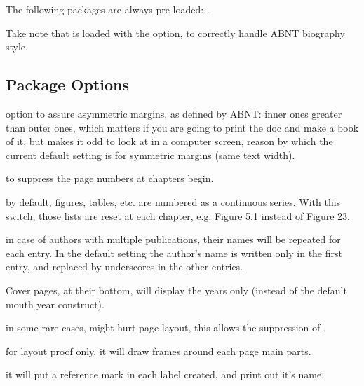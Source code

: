 \documentclass[article,nogeometry,english,tocdepth=3,secdepth=3]{ufrgscca} %
\begin{document}
The following packages are always pre-loaded: .

Take note that  is loaded with the \textbf{} option, to correctly handle ABNT biography style.

\subsection{Package Options}


\begin{describelist}{option}
	 {to assure asymmetric margins, as defined by ABNT: inner ones greater than outer ones, which matters if you are going to print the doc and make a book of it, but makes it odd to look at in a computer screen, reason by which the current default setting is for symmetric margins (same text width).}

 	 { to suppress the page numbers at chapters begin.}

	 { by default, figures, tables, etc. are numbered as a continuous series. With this switch, those lists are reset at each chapter, e.g. Figure 5.1 instead of Figure 23.}

	 { in case of authors with multiple publications, their names will be repeated for each entry. In the default setting the author's name is written only in the first entry, and replaced by underscores in the other entries.}

     { Cover pages, at their bottom, will display the years only (instead of the default mouth year construct).}
    
  
	 { in some rare cases,  might hurt page layout, this allows the suppression of .}

	 { for layout proof only, it will draw frames around each page main parts.}

	 { it will put a reference mark in each label created, and print out it's name.}


\end{describelist}
\end{document}

